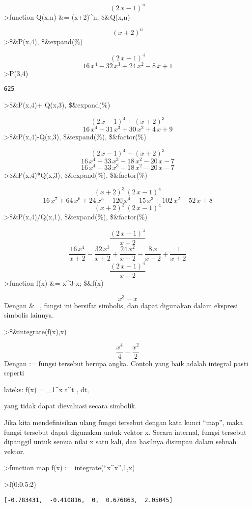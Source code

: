 \documentclass[
]{book}
\begin{document}
\[\left(2\,x-1\right)^{n}\]\textgreater function Q(x,n) \&= (x+2)\^{}n; \$\&Q(x,n)

\[\left(x+2\right)^{n}\]\textgreater\$\&P(x,4), \$\&expand(\%)

\[\left(2\,x-1\right)^4\]\[16\,x^4-32\,x^3+24\,x^2-8\,x+1\]\textgreater P(3,4)

\begin{verbatim}
625
\end{verbatim}

\textgreater\$\&P(x,4)+ Q(x,3), \$\&expand(\%)

\[\left(2\,x-1\right)^4+\left(x+2\right)^3\]\[16\,x^4-31\,x^3+30\,x^2+4\,x+9\]\textgreater\$\&P(x,4)-Q(x,3), \$\&expand(\%), \$\&factor(\%)

\[\left(2\,x-1\right)^4-\left(x+2\right)^3\]\[16\,x^4-33\,x^3+18\,x^2-20\,x-7\]\[16\,x^4-33\,x^3+18\,x^2-20\,x-7\]\textgreater\$\&P(x,4)*Q(x,3), \$\&expand(\%), \$\&factor(\%)

\[\left(x+2\right)^3\,\left(2\,x-1\right)^4\]\[16\,x^7+64\,x^6+24\,x^5-120\,x^4-15\,x^3+102\,x^2-52\,x+8\]\[\left(x+2\right)^3\,\left(2\,x-1\right)^4\]\textgreater\$\&P(x,4)/Q(x,1), \$\&expand(\%), \$\&factor(\%)

\[\frac{\left(2\,x-1\right)^4}{x+2}\]\[\frac{16\,x^4}{x+2}-\frac{32\,x^3}{x+2}+\frac{24\,x^2}{x+2}-\frac{8
 \,x}{x+2}+\frac{1}{x+2}\]\[\frac{\left(2\,x-1\right)^4}{x+2}\]\textgreater function f(x) \&= x\^{}3-x; \$\&f(x)

\[x^3-x\]Dengan \&=, fungsi ini bersifat simbolis, dan dapat digunakan dalam ekspresi simbolis lainnya.

\textgreater\$\&integrate(f(x),x)

\[\frac{x^4}{4}-\frac{x^2}{2}\]Dengan := fungsi tersebut berupa angka. Contoh yang baik adalah integral pasti seperti

lateks: f(x) = \int\_1\^{}x t\^{}t , dt,

yang tidak dapat dievaluasi secara simbolik.

Jika kita mendefinisikan ulang fungsi tersebut dengan kata kunci ``map'', maka fungsi tersebut dapat digunakan untuk vektor x. Secara internal, fungsi tersebut dipanggil untuk semua nilai x satu kali, dan hasilnya disimpan dalam sebuah vektor.

\textgreater function map f(x) := integrate(``x\^{}x'',1,x)

\textgreater f(0:0.5:2)

\begin{verbatim}
[-0.783431,  -0.410816,  0,  0.676863,  2.05045]
\end{verbatim}
\end{document}
